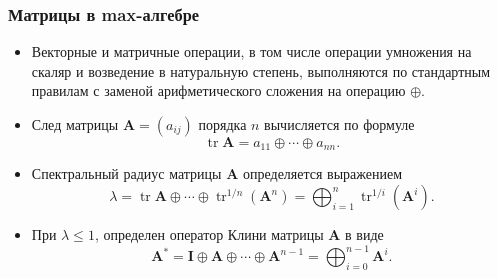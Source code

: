 \documentclass[ucs, notheorems, handout]{beamer}
\begin{document}
\begin{frame}
    \frametitle{Матрицы в max-алгебре}
    \begin{itemize}
        \item Векторные и матричные операции, в том числе операции умножения на скаляр и возведение в натуральную степень, выполняются по стандартным правилам с заменой арифметического сложения на операцию $\oplus$. 
        
        
        
        
        \item След матрицы $\bm{A}=(a_{ij})$ порядка $n$ вычисляется по формуле
        $$\mathop\mathrm{tr}\bm{A}=a_{11}\oplus\cdots\oplus a_{nn}.$$

        \item Спектральный радиус матрицы $\bm{A}$ определяется выражением
        \begin{equation*}
        \lambda
        =
        \mathop\mathrm{tr}\bm{A}\oplus\cdots\oplus\mathop\mathrm{tr}\nolimits^{1/n}(\bm{A}^{n})
        =
        \bigoplus_{i=1}^{n}{\mathop\mathrm{tr}}^{1/i}(\bm{A}^{i}).
        \end{equation*}

        \item При $\lambda\leq1$, определен оператор Клини матрицы $\bm{A}$ в виде
        \begin{equation*}
        \bm{A}^{\ast}
        =
        \bm{I}\oplus\bm{A}\oplus\cdots\oplus\bm{A}^{n-1}
        =
        \bigoplus_{i=0}^{n-1}\bm{A}^{i}.
        \end{equation*}
    \end{itemize}
\end{frame}
\end{document}
